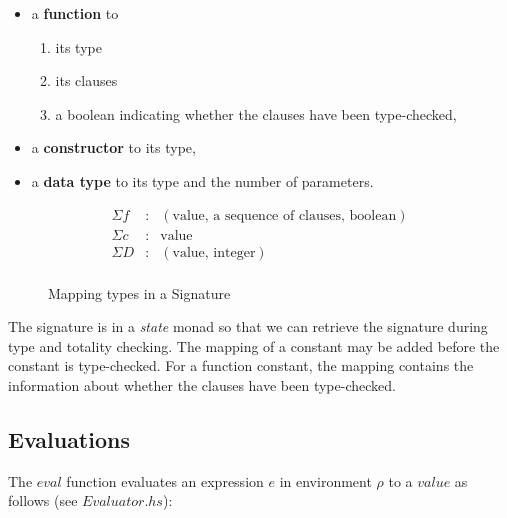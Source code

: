 \documentclass[acmsmall]{acmart}
\begin{document}
\begin{itemize}
  \item a \textbf{function} to
        \begin{enumerate}
          \item its type
          \item its clauses
          \item a boolean indicating whether the clauses have been type-checked,
        \end{enumerate}
  \item a \textbf{constructor} to its type,
  \item a \textbf{data type} to its type and the number of parameters.
\end{itemize}

\begin{figure}[H]
  \begin{equation*}
    \begin{aligned}
      \Sigma f & : & (\textrm{value, a sequence of clauses, boolean}) \\
      \Sigma c & : & \textrm{value}                                   \\
      \Sigma D & : & (\textrm{value, integer})                        \\
    \end{aligned}
  \end{equation*}
  \caption{Mapping types in a Signature}
\end{figure}

The signature is in a \emph{state} monad so that we can retrieve the signature during type and totality checking. The mapping of a constant may be added before the constant is type-checked. For a function constant, the mapping contains the information about whether the clauses have been type-checked.

\subsection{Evaluations}
\label{sec:eval}

The $eval$ function evaluates an expression $e$ in environment $\rho$ to a
$value$ as follows (see $Evaluator.hs$):
\end{document}
